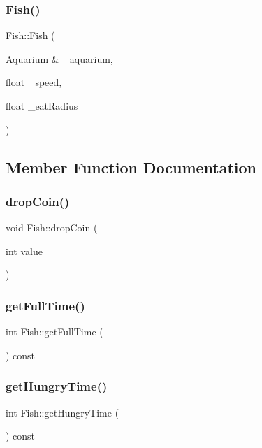 \subsubsection{\texorpdfstring{Fish()}{Fish()}}
{\footnotesize\ttfamily Fish\+::\+Fish (\begin{DoxyParamCaption}\item[{\mbox{\hyperlink{class_aquarium}{Aquarium}} \&}]{\+\_\+aquarium,  }\item[{float}]{\+\_\+speed,  }\item[{float}]{\+\_\+eat\+Radius }\end{DoxyParamCaption})}



\subsection{Member Function Documentation}
\mbox{\label{class_fish_add7c1e5a1f01384f3e5d919d880941bd}} 
\subsubsection{\texorpdfstring{drop\+Coin()}{dropCoin()}}
{\footnotesize\ttfamily void Fish\+::drop\+Coin (\begin{DoxyParamCaption}\item[{int}]{value }\end{DoxyParamCaption})}

\mbox{\label{class_fish_aad3fb1122b2fbb928f854d73726aa234}} 
\subsubsection{\texorpdfstring{get\+Full\+Time()}{getFullTime()}}
{\footnotesize\ttfamily int Fish\+::get\+Full\+Time (\begin{DoxyParamCaption}{ }\end{DoxyParamCaption}) const}

\mbox{\label{class_fish_abcd4464c7dce28026fe2738b75576875}} 
\subsubsection{\texorpdfstring{get\+Hungry\+Time()}{getHungryTime()}}
{\footnotesize\ttfamily int Fish\+::get\+Hungry\+Time (\begin{DoxyParamCaption}{ }\end{DoxyParamCaption}) const}

